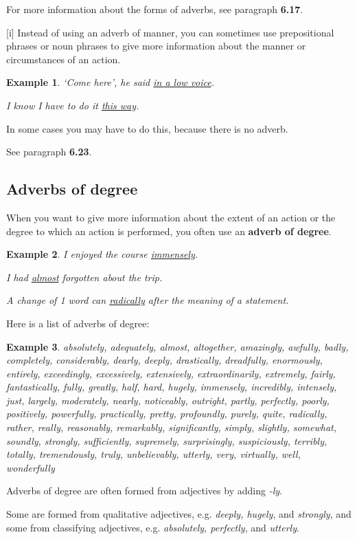 \documentclass[oneside]{book}
\numberwithin{equation}{section}
\newtheorem{example}{Example}[section]
\begin{document}
For more information about the forms of adverbs, see paragraph \textbf{6.17}.

%
\noindent{} [i] Instead of using an adverb of manner, you can sometimes use prepositional phrases or noun phrases to give more information about the manner or circumstances of an action.
\begin{example}
    `Come here', he said \underline{in a low voice}.
    
    I know I have to do it \underline{this way}.
\end{example}
In some cases you may have to do this, because there is no adverb.

See paragraph \textbf{6.23}.

\subsection{Adverbs of degree}
\noindent{} When you want to give more information about the extent of an action or the degree to which an action is performed, you often use an \textbf{adverb of degree}.
\begin{example}
    I enjoyed the course \underline{immensely}.
    
    I had \underline{almost} forgotten about the trip.
    
    A change of 1 word can \underline{radically} after the meaning of a statement.
\end{example}
%
\noindent{} Here is a list of adverbs of degree:
\begin{example}
    absolutely, adequately, almost, altogether, amazingly, awfully, badly, completely, considerably, dearly, deeply, drastically, dreadfully, enormously, entirely, exceedingly, excessively, extensively, extraordinarily, extremely, fairly, fantastically, fully, greatly, half, hard, hugely, immensely, incredibly, intensely, just, largely, moderately, nearly, noticeably, outright, partly, perfectly, poorly, positively, powerfully, practically, pretty, profoundly, purely, quite, radically, rather, really, reasonably, remarkably, significantly, simply, slightly, somewhat, soundly, strongly, sufficiently, supremely, surprisingly, suspiciously, terribly, totally, tremendously, truly, unbelievably, utterly, very, virtually, well, wonderfully
\end{example}
%
\noindent{} Adverbs of degree are often formed from adjectives by adding \textit{-ly}.

Some are formed from qualitative adjectives, e.g. \textit{deeply, hugely}, and \textit{strongly}, and some from classifying adjectives, e.g. \textit{absolutely, perfectly}, and \textit{utterly}.
\end{document}
